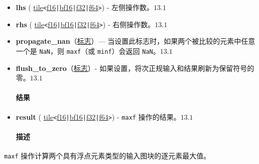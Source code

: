\documentclass{article}
\begin{document}
\begin{itemize}
\item \textbf{lhs} ( \href{https://docs.nvidia.com/cuda/tile-ir/latest/sections/types.html#type-tile}{tile}\texttt{<}\href{https://docs.nvidia.com/cuda/tile-ir/latest/sections/types.html#subsection-element-types}{f16}\texttt{|}\href{https://docs.nvidia.com/cuda/tile-ir/latest/sections/types.html#subsection-element-types}{bf16}\texttt{|}\href{https://docs.nvidia.com/cuda/tile-ir/latest/sections/types.html#subsection-element-types}{f32}\texttt{|}\href{https://docs.nvidia.com/cuda/tile-ir/latest/sections/types.html#subsection-element-types}{f64}\texttt{>}) - 左侧操作数。$\boxed{13.1}$
\item \textbf{rhs} ( \href{https://docs.nvidia.com/cuda/tile-ir/latest/sections/types.html#type-tile}{tile}\texttt{<}\href{https://docs.nvidia.com/cuda/tile-ir/latest/sections/types.html#subsection-element-types}{f16}\texttt{|}\href{https://docs.nvidia.com/cuda/tile-ir/latest/sections/types.html#subsection-element-types}{bf16}\texttt{|}\href{https://docs.nvidia.com/cuda/tile-ir/latest/sections/types.html#subsection-element-types}{f32}\texttt{|}\href{https://docs.nvidia.com/cuda/tile-ir/latest/sections/types.html#subsection-element-types}{f64}\texttt{>}) - 右侧操作数。$\boxed{13.1}$
\item \textbf{propagate\_nan}（\href{https://docs.nvidia.com/cuda/tile-ir/latest/sections/operations.html#type-flag}{标志}）--- 当设置此标志时，如果两个被比较的元素中任意一个是 \texttt{NaN}，则 \texttt{maxf}（或 \texttt{minf}）会返回 \texttt{NaN}。$\boxed{13.1}$
\item \textbf{flush\_to\_zero}（\href{https://docs.nvidia.com/cuda/tile-ir/latest/sections/operations.html#type-flag}{标志}）- 如果设置，将次正规输入和结果刷新为保留符号的零。$\boxed{13.1}$




\paragraph{结果}


\item \textbf{result} ( \href{https://docs.nvidia.com/cuda/tile-ir/latest/sections/types.html#type-tile}{tile}\texttt{<}\href{https://docs.nvidia.com/cuda/tile-ir/latest/sections/types.html#subsection-element-types}{f16}\texttt{|}\href{https://docs.nvidia.com/cuda/tile-ir/latest/sections/types.html#subsection-element-types}{bf16}\texttt{|}\href{https://docs.nvidia.com/cuda/tile-ir/latest/sections/types.html#subsection-element-types}{f32}\texttt{|}\href{https://docs.nvidia.com/cuda/tile-ir/latest/sections/types.html#subsection-element-types}{f64}\texttt{>}) - \texttt{maxf} 操作的结果。$\boxed{13.1}$




\paragraph{描述}


\end{itemize}
\texttt{maxf} 操作计算两个具有浮点元素类型的输入图块的逐元素最大值。
\end{document}
